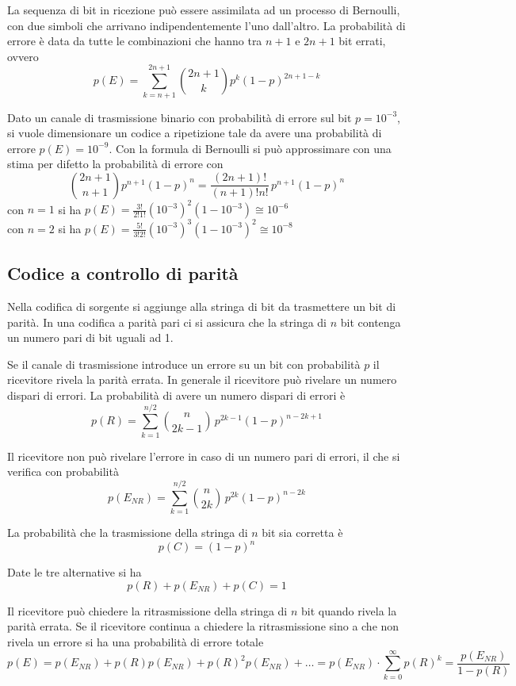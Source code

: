 La sequenza di bit in ricezione può essere assimilata ad un processo di Bernoulli, con due simboli che arrivano indipendentemente l'uno dall'altro. La probabilità di errore è data da tutte le combinazioni che hanno tra $n+1$ e $2n+1$ bit errati, ovvero
\[p(E)=\sum_{k=n+1}^{2n+1}\binom{2n+1}{k}p^k(1-p)^{2n+1-k}\]

\begin{esempio}
Dato un canale di trasmissione binario con probabilità di errore sul bit $p=10^{-3}$, si vuole dimensionare un codice a ripetizione tale da avere una probabilità di errore $p(E)=10^{-9}$.
Con la formula di Bernoulli si può approssimare con una stima per difetto la probabilità di errore con \[\binom{2n+1}{n+1}p^{n+1}(1-p)^n=\frac{(2n+1)!}{(n+1)!n!}\,p^{n+1}(1-p)^n\]
con $n=1$ si ha $p(E)=\frac{3!}{2!1!}(10^{-3})^2(1-10^{-3})\cong 10^{-6}$\\
con $n=2$ si ha $p(E)=\frac{5!}{3!2!}(10^{-3})^3(1-10^{-3})^2\cong 10^{-8}$\\
\end{esempio}

\subsection{Codice a controllo di parità}
Nella codifica di sorgente  si aggiunge alla stringa di bit da trasmettere un bit di parità. In una codifica a parità pari ci si assicura che la stringa di $n$ bit contenga un numero pari di bit uguali ad 1.

Se il canale di trasmissione introduce un errore su un bit con probabilità $p$ il ricevitore rivela la parità errata. In generale il ricevitore può rivelare un numero dispari di errori.
La probabilità di avere un numero dispari di errori è
\[p(R)=\sum_{k=1}^{n/2}\binom{n}{2k-1}\,p^{2k-1}(1-p)^{n-2k+1}\]

Il ricevitore non può rivelare l'errore in caso di un numero pari di errori, il che si verifica con probabilità
\[p(E_{NR})=\sum_{k=1}^{n/2}\binom{n}{2k}\,p^{2k}(1-p)^{n-2k}\]

La probabilità che la trasmissione della stringa di $n$ bit sia corretta è
\[p(C)=(1-p)^n\]

Date le tre alternative si ha
\[p(R)+p(E_{NR})+p(C)=1\]

Il ricevitore può chiedere la ritrasmissione della stringa di $n$ bit quando rivela la parità errata.
Se il ricevitore continua a chiedere la ritrasmissione sino a che non rivela un errore si ha una probabilità di errore totale
\[p(E)=p(E_{NR})+p(R)p(E_{NR})+p(R)^2p(E_{NR})+\dots=p(E_{NR})\cdot\sum_{k=0}^{\infty}p(R)^k=\frac{p(E_{NR})}{1-p(R)}\]

